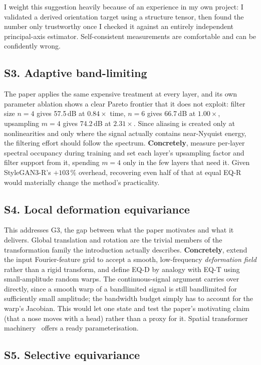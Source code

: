 \documentclass[11pt,a4paper]{article}
\begin{document}
I weight this suggestion heavily because of an experience in my own project: I
validated a derived orientation target using a structure tensor, then found the
number only trustworthy once I checked it against an entirely independent
principal-axis estimator. Self-consistent measurements are comfortable and can be
confidently wrong.

\subsection*{S3. Adaptive band-limiting}

The paper applies the same expensive treatment at every layer, and its own
parameter ablation shows a clear Pareto frontier that it does not exploit: filter
size $n=4$ gives 57.5\,dB at $0.84\times$ time, $n=6$ gives 66.7\,dB at
$1.00\times$, upsampling $m=4$ gives 74.2\,dB at $2.31\times$. Since aliasing is
created only at nonlinearities and only where the signal actually contains
near-Nyquist energy, the filtering effort should follow the spectrum.
\textbf{Concretely}, measure per-layer spectral occupancy during training and set
each layer's upsampling factor and filter support from it, spending $m=4$ only in
the few layers that need it. Given StyleGAN3-R's $+103\,\%$ overhead, recovering
even half of that at equal EQ-R would materially change the method's
practicality.

\subsection*{S4. Local deformation equivariance}

This addresses G3, the gap between what the paper motivates and what it delivers.
Global translation and rotation are the trivial members of the transformation
family the introduction actually describes. \textbf{Concretely}, extend the input
Fourier-feature grid to accept a smooth, low-frequency \emph{deformation field}
rather than a rigid transform, and define EQ-D by analogy with EQ-T using
small-amplitude random warps. The continuous-signal argument carries over
directly, since a smooth warp of a bandlimited signal is still bandlimited for
sufficiently small amplitude; the bandwidth budget simply has to account for the
warp's Jacobian. This would let one state and test the paper's motivating claim (that a nose moves with a head) rather than a proxy for it. Spatial
transformer machinery~\citep{jaderberg2015stn} offers a ready parameterisation.

\subsection*{S5. Selective equivariance}
\end{document}
